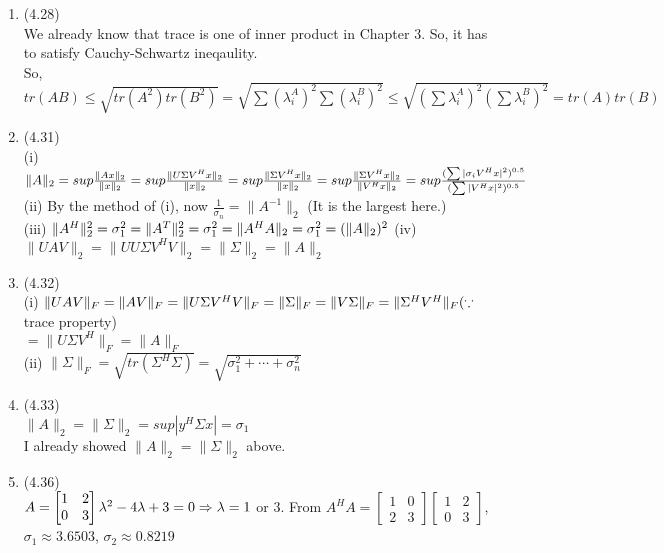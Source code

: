 \documentclass[letterpaper,12pt]{article}
\theoremstyle{definition}
\begin{document}
\begin{enumerate}
 	\item (4.28) \\
We already know that trace is one of inner product in Chapter 3. So, it has to satisfy Cauchy-Schwartz ineqaulity.\\
So, $ tr(AB) \leq \sqrt{tr(A^2)tr(B^2)} = \sqrt{\sum (\lambda_i^A)^2\sum (\lambda_i^B)^2} \leq \sqrt{(\sum \lambda_i^A)^2(\sum \lambda_i^B)^2} = tr(A)tr(B)
$



 	\item (4.31) \\
(i) $\|A\|_2 = sup\frac{\| Ax\|_2}{\| x\|_2} =sup\frac{\| U\Sigma V^Hx\|_2}{\| x\|_2} =sup\frac{\| \Sigma V^Hx\|_2}{\| x\|_2} =sup\frac{\| \Sigma V^Hx\|_2}{\| V^Hx\|_2} = sup\frac{(\sum|\sigma_i V^Hx|^2 )^{0.5}}{(\sum|V^Hx|^2 )^{0.5}} \\$
(ii) By the method of (i), now $\frac{1}{\sigma_n}=\|A^{-1}\|_2 $ (It is the largest here.)$
$ \\
(iii) $\| A^H\|_2^2=\sigma_1^2=\| A^T\|_2^2 = \sigma_1^2 = \| A^HA\|_2 = \sigma_1^2 = (\| A\|_2)^2\\$
(iv) $\| UAV\|_2 = \| UU\Sigma V^HV\|_2 = \| \Sigma\|_2 = \| A\|_2$





 	\item (4.32) \\
(i) $\| UAV\|_F =  \| AV\|_F = \| U\Sigma V^HV\|_F = \| \Sigma \|_F = \| V \Sigma \|_F = \| \Sigma^H V^H \|_F \\(\because $ trace property)\\
$= \| U \Sigma V^H\|_F = \| A \|_F
$\\
(ii) $\| \Sigma \|_F = \sqrt{tr(\Sigma^H\Sigma)} = \sqrt{\sigma_1^2 + \cdots + \sigma_n^2}$



 	\item (4.33) \\
$\| A \|_2 = \| \Sigma \|_2 = sup|y^H\Sigma x| = \sigma_1
$\\ I already showed $\| A \|_2 = \| \Sigma \|_2 $  above.


 	\item (4.36) \\
$A = \begin{bmatrix} 1&2\\0&3  \end{bmatrix}\\
\lambda^2-4\lambda+3=0 \Rightarrow \lambda = 1$ or $3.$
From $A^HA=\begin{bmatrix} 1&0\\2&3  \end{bmatrix} \begin{bmatrix} 1&2\\0&3  \end{bmatrix}$, \\$\sigma_1 \approx 3.6503$, $\sigma_2\approx 0.8219
$





\end{enumerate}
\end{document}
